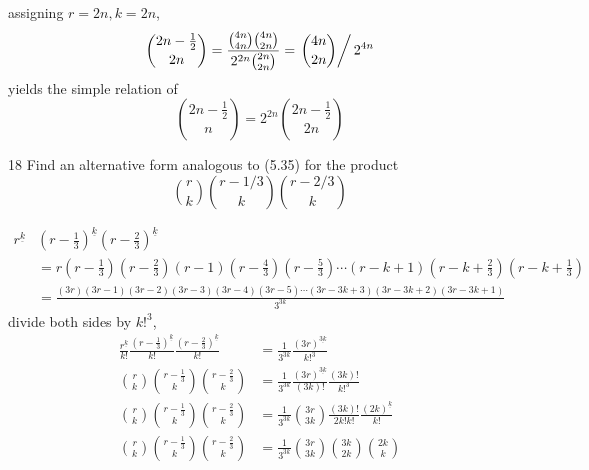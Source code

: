 \documentclass[a4paper,12pt]{article}
\makeatletter
\newtheorem*{solution}{Solution}
\theoremstyle{definition}
\renewenvironment{solution}[1][Solution] {\par\pushQED{\qed}\normalfont\topsep6\p@\@plus6\p@\relax\trivlist\item[\hskip\labelsep\bfseries#1\@addpunct{.}]\ignorespaces}{\popQED\endtrivlist\@endpefalse} \makeatother
\newenvironment{problems}{\begin{list}{}{\renewcommand{\makelabel}[1]{\textbf{##1}\hfil}}}{\end{list}}
\makeatother
\begin{document}
\begin{problems}
\begin{solution}
       assigning $r=2n,k=2n$,
       \begin{equation*}
           \binom{2n-\frac{1}{2}}{2n} = \frac{\binom{4n}{4n}\binom{4n}{2n}}{2^{2n}\binom{2n}{2n}} = \left.\binom{4n}{2n}\right\slash 2^{4n}
       \end{equation*}
       yields the simple relation of
       \begin{equation*}
           \binom{2n-\frac{1}{2}}{n} = 2^{2n}\binom{2n-\frac{1}{2}}{2n}
       \end{equation*}
   \end{solution} 
   \item[18]Find an alternative form analogous to (5.35) for the product
   \begin{equation*}
       \binom{r}{k}\binom{r-1/3}{k}\binom{r-2/3}{k}
   \end{equation*}
   \begin{solution}
    \begin{align*}
        r^{\underline{k}}&\left(r-\frac{1}{3}\right)^{\underline{k}}\left(r-\frac{2}{3}\right)^{\underline{k}}\\ &= r\left(r-\frac{1}{3}\right)\left(r-\frac{2}{3}\right)(r-1)\left(r-\frac{4}{3}\right)\left(r-\frac{5}{3}\right)\cdots (r-k+1)\left(r-k+\frac{2}{3}\right)\left(r-k+\frac{1}{3}\right) \\
        &=\frac{(3r)(3r-1)(3r-2)(3r-3)(3r-4)(3r-5)\cdots(3r-3k+3)(3r-3k+2)(3r-3k+1)}{3^{3k}}
    \end{align*}
    divide both sides by $k!^3$,
    \begin{align*}
        \frac{r^{\underline{k}}}{k!}\frac{\left(r-\frac{1}{3}\right)^{\underline{k}}}{k!}\frac{\left(r-\frac{2}{3}\right)^{\underline{k}}}{k!} &= \frac{1}{3^{3k}}\frac{(3r)^{\underline{3k}}}{k!^3}\\
        \binom{r}{k}\binom{r-\frac{1}{3}}{k}\binom{r-\frac{2}{3}}{k} &= \frac{1}{3^{3k}}\frac{(3r)^{\underline{3k}}}{(3k)!}\frac{(3k)!}{k!^3}\\
        \binom{r}{k}\binom{r-\frac{1}{3}}{k}\binom{r-\frac{2}{3}}{k} &= \frac{1}{3^{3k}}\binom{3r}{3k}\frac{(3k)!}{2k!k!}\frac{(2k)^{\underline{k}}}{k!}\\
        \binom{r}{k}\binom{r-\frac{1}{3}}{k}\binom{r-\frac{2}{3}}{k} &= \frac{1}{3^{3k}}\binom{3r}{3k}\binom{3k}{2k}\binom{2k}{k}
    \end{align*}

   \end{solution}
\end{problems}
\end{document}
